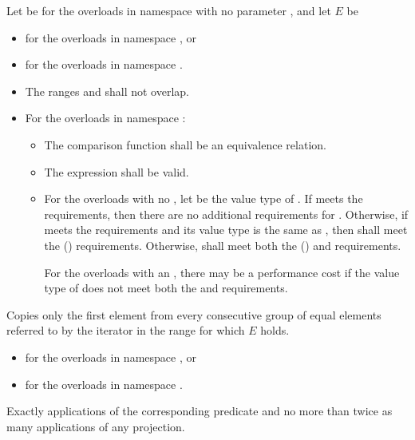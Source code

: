 \begin{itemdescr}
\pnum
Let  be  for the overloads
in namespace  with no parameter , and
let $E$ be
\begin{itemize}
\setlength{\emergencystretch}{1em}
\item
  for the overloads in namespace , or
\item
  for the overloads in namespace .
\end{itemize}

\pnum
\requires
\begin{itemize}
\item
  The ranges  and 
  shall not overlap.
\item
  For the overloads in namespace :
  \begin{itemize}
  \item
    The comparison function shall be an equivalence relation.
  \item
    The expression  shall be valid.
  \item
    For the overloads with no ,
    let  be the value type of .
    If  meets
    the  requirements,
    then there are no additional requirements for .
    Otherwise, if  meets
    the  requirements and
    its value type is the same as ,
    then  shall meet
    the  () requirements.
    Otherwise,  shall meet both
    the  () and
     requirements.
    \begin{note}
    For the overloads with an ,
    there may be a performance cost
    if the value type of  does not meet both the
     and  requirements.
    \end{note}
  \end{itemize}
\end{itemize}

\pnum
\effects
Copies only the first element from every consecutive group of equal elements
referred to by the iterator  in the range 
for which $E$ holds.

\pnum
\returns
\begin{itemize}
\item {} for the overloads in namespace , or
\item {} for the overloads in namespace .
\end{itemize}

\pnum
\complexity
Exactly  applications
of the corresponding predicate
and no more than twice as many applications of any projection.
\end{itemdescr}

